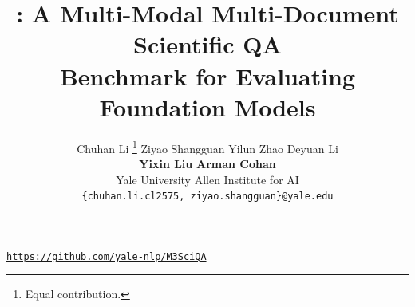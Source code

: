 \documentclass[11pt]{article}
\title{\data: A Multi-Modal Multi-Document Scientific QA\\ Benchmark for Evaluating Foundation Models}
\author{
    Chuhan Li \yale\thanks{Equal contribution.} \aspace 
    Ziyao Shangguan \yale\equalCon \aspace 
    Yilun Zhao \yale  \aspace 
    Deyuan Li \yale  \aspace \\
    \textbf{Yixin Liu} \yale  \aspace 
    \textbf{Arman Cohan} \yale \aiTwo \aspace\\
    \yale Yale University \aspace
    \aiTwo Allen Institute for AI \\
      \texttt{\{chuhan.li.cl2575, ziyao.shangguan\}@yale.edu}
}
\begin{document}
\maketitle

\begin{minipage}[t]{2\linewidth}
\vspace{-1.3cm}
  \centering
  \href{https://github.com/yale-nlp/M3SciQA}{{\faGithub{}}\xspace\texttt{https://github.com/yale-nlp/M3SciQA}} 
\end{minipage}















\appendix
{}

\hypersetup{linkcolor=black}
\tableofcontents







\end{document}
